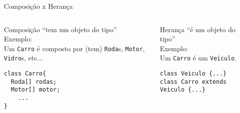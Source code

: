 %   

\begin{frame}[fragile]{Composição x Herança}
  \small

  \begin{columns}
    \begin{column}{0.4\textwidth}
      \begin{block}{Composição}
         ``\alert{tem} um objeto do tipo''\\

        Exemplo:\\
        Um {\tt Carro} é composto por (tem) {\tt Roda}s, {\tt Motor}, {\tt
          Vidro}s, etc...
\begin{lstlisting}
class Carro{
  Roda[] rodas;
  Motor[] motor;
    ...
}
        \end{lstlisting}
        
      \end{block}

    \end{column}
    
    \begin{column}{0.4666\textwidth}
      
      \begin{block}{Herança}
        ``\alert{é} um objeto do tipo''\\

        Exemplo:\\
        Um {\tt Carro} é um {\tt Veiculo}.
        
\begin{lstlisting}
class Veiculo {...}
class Carro extends Veiculo {...}
\end{lstlisting}

      \end{block}

    \end{column}
  \end{columns}
  
\end{frame}



